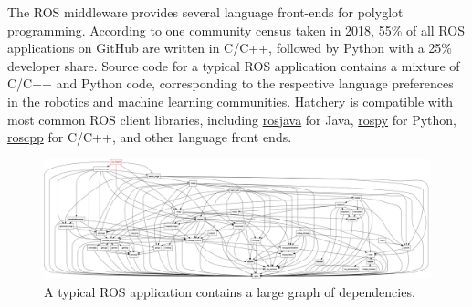 The ROS middleware provides several language front-ends for polyglot programming. According to one community census taken in 2018, 55\% of all ROS applications on GitHub are written in C/C++, followed by Python with a 25\%~\citep{Areserio54:online} developer share. Source code for a typical ROS application contains a mixture of C/C++ and Python code, corresponding to the respective language preferences in the robotics and machine learning communities. Hatchery is compatible with most common ROS client libraries, including \href{https://wiki.ros.org/rosjava}{rosjava} for Java, \href{https://wiki.ros.org/rospy}{rospy} for Python, \href{https://wiki.ros.org/rospy}{roscpp} for C/C++, and other language front ends.

\begin{figure}
    \centering
    \includegraphics[width=\textwidth]{../figures/rqt_dep_graph.png}
    \caption{A typical ROS application contains a large graph of dependencies.}
\end{figure}

